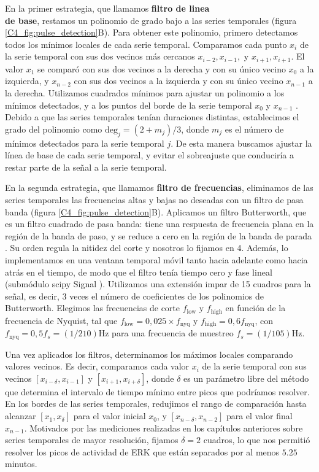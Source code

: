 \documentclass[./main.tex]{subfiles}
\begin{document}
En la primer estrategia, que llamamos \textbf{filtro de linea\\de base}, restamos un polinomio de grado bajo a las series temporales (figura \ref{C4_fig:pulse_detection}B). Para obtener este polinomio, primero detectamos todos los mínimos locales de cada serie temporal. Comparamos cada punto $x_i$ de la serie temporal con sus dos vecinos más cercanos $x_{i-2},x_{i-1}, \text{ y } x_{i+1},x_{i+1}$. El valor $x_1$ se comparó con sus dos vecinos a la derecha y con su único vecino $x_0$ a la izquierda, y $x_{n-2}$ con sus dos vecinos a la izquierda y con su único vecino $x_{n-1}$ a la derecha. Utilizamos cuadrados mínimos para ajustar un polinomio a los mínimos detectados, y a los puntos del borde de la serie temporal $x_0$ y $x_{n-1}$ \cite{Harris2020}. Debido a que las series temporales tenían duraciones distintas, establecimos el grado del polinomio como $\text{deg}_j = (2+m_j) / 3$, donde $m_j$ es el número de mínimos detectados para la serie temporal $j$. De esta manera buscamos ajustar la línea de base de cada serie temporal, y evitar el sobreajuste que conduciría a restar parte de la señal a la serie temporal.  



En la segunda estrategia, que llamamos \textbf{filtro de frecuencias}, eliminamos de las series temporales las frecuencias altas y bajas no deseadas con un filtro de pasa banda (figura \ref{C4_fig:pulse_detection}B). Aplicamos un filtro Butterworth, que es un filtro cuadrado de pasa banda: tiene una respuesta de frecuencia plana en la región de la banda de paso, y se reduce a cero en la región de la banda de parada \cite{Butterworth1930}. Su orden regula la nitidez del corte y nosotros lo fijamos en 4. Además, lo implementamos en una ventana temporal móvil tanto hacia adelante como hacia atrás en el tiempo, de modo que el filtro tenía tiempo cero y fase lineal (submódulo scipy Signal \cite{Virtanen2020}). Utilizamos una extensión impar de 15 cuadros para la señal, es decir, 3 veces el número de coeficientes de los polinomios de Butterworth. Elegimos las frecuencias de corte $f_{\text{low}}$ y $f_{\text{high}}$ en función de la frecuencia de Nyquist, tal que $f_{\text{low}}= 0,025 \times f_{\text{nyq}}$ y $f_{\text{high}}=0,6 f_{\text{nyq}}$, con $f_{\text{nyq}}=0,5 f_s =(1/210) $Hz para una frecuencia de muestreo $f_s=(1/105) $Hz.    



Una vez aplicados los filtros, determinamos los máximos locales comparando valores vecinos. Es decir, comparamos cada valor $x_i$ de la serie temporal con sus vecinos $[x_{i-\delta}, x_{i-1}]$ y $[x_{i+1}, x_{i+\delta}]$, donde $\delta$ es un parámetro libre del método que determina el intervalo de tiempo mínimo entre picos que podríamos resolver. En los bordes de las series temporales, redujimos el rango de comparación hasta alcanzar $[x_1, x_\delta]$ para el valor inicial $x_0$, y $[x_{n-\delta}, x_{n-2}]$ para el valor final $x_{n-1}$. Motivados por las mediciones realizadas en los capítulos anteriores sobre series temporales de mayor resolución, fijamos $\delta = 2$ cuadros, lo que nos permitió resolver los picos de actividad de ERK que están separados por al menos $5.25$ minutos.
\end{document}
